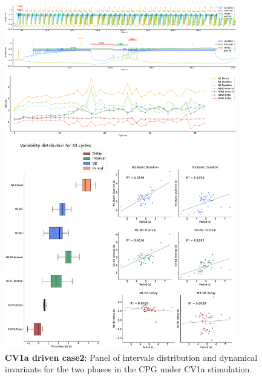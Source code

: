 \begin{figure}[htbp]
	\centering
	\includegraphics[width=0.9\textwidth]{./invariants/data/SUSSEX/CV1a_driven2/images/panel_with_intervals.pdf}
	
	\caption{\textbf{CV1a driven case2}: Panel of intervals distribution and dynamical invariants for the two phases in the CPG under CV1a stimulation.}
	\label{fig:cv1a 2 2phases}
\end{figure}

%
%	




